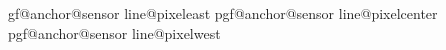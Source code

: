 {{{{        }%
        \expandafter\xdef\csname pgf@anchor@sensor line@pixel\space\the\c@pgf@counta\space east%
        \expandafter\xdef\csname pgf@anchor@sensor line@pixel\space\the\c@pgf@counta\space center%
        \expandafter\xdef\csname pgf@anchor@sensor line@pixel\space\the\c@pgf@counta\space west%
      }{\relax}%
      \advance{}\relax%
    \repeatpgfmathloop%
  }%

  \inheritanchorborder[from=rectangle]

  \backgroundpath
  {
    \pgfpathrectanglecorners{\northeast}{\southwest}

}}
